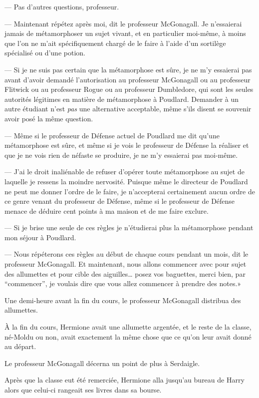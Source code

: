 --- Pas d'autres questions, professeur.

--- Maintenant répétez après moi, dit le professeur McGonagall. Je n'essaierai jamais de métamorphoser un sujet vivant, et en particulier moi-même, à moins que l'on ne m'ait spécifiquement chargé de le faire à l'aide d'un sortilège spécialisé ou d'une potion.

--- Si je ne suis pas certain que la métamorphose est sûre, je ne m'y essaierai pas avant d'avoir demandé l'autorisation au professeur McGonagall ou au professeur Flitwick ou au professeur Rogue ou au professeur Dumbledore, qui sont les seules autorités légitimes en matière de métamorphose à Poudlard. Demander à un autre étudiant n'est \emph{pas} une alternative acceptable, même s'ils disent se souvenir avoir posé la même question.

--- Même si le professeur de Défense actuel de Poudlard me dit qu'une métamorphose est sûre, et même si je vois le professeur de Défense la réaliser et que je ne vois rien de néfaste se produire, je ne m'y essaierai pas moi-même.

--- J'ai le droit inaliénable de refuser d'opérer toute métamorphose au sujet de laquelle je ressens la moindre nervosité. Puisque même le directeur de Poudlard ne peut me donner l'ordre de le faire, je n'accepterai certainement aucun ordre de ce genre venant du professeur de Défense, même si le professeur de Défense menace de déduire cent points à ma maison et de me faire exclure.

--- Si je brise une seule de ces règles je n'étudierai plus la métamorphose pendant mon séjour à Poudlard.

--- Nous répéterons ces règles au début de chaque cours pendant un mois, dit le professeur McGonagall. Et maintenant, nous allons commencer avec pour sujet des allumettes et pour cible des aiguilles… posez vos baguettes, merci bien, par “commencer”, je voulais dire que vous allez commencer à prendre des notes.»

Une demi-heure avant la fin du cours, le professeur McGonagall distribua des allumettes.

À la fin du cours, Hermione avait une allumette argentée, et le reste de la classe, né-Moldu ou non, avait exactement la même chose que ce qu'on leur avait donné au départ.

Le professeur McGonagall décerna un point de plus à Serdaigle.

\later

Après que la classe eut été remerciée, Hermione alla jusqu'au bureau de Harry alors que celui-ci rangeait ses livres dans sa bourse.

